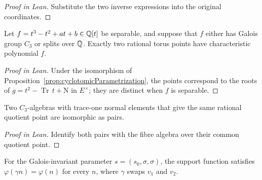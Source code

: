 \begin{proof}[Proof in Lean]

\leanok

Substitute the two inverse expressions into the original coordinates.

\end{proof}

\begin{supportinglemma}

\label{helper:polynomialFibres}


\leanok

Let $f=t^3-t^2+at+b\in\mathbb{Q}[t]$ be separable, and suppose that $f$ either has Galois group $C_3$ or splits over $\mathbb{Q}$. Exactly two rational torus points have characteristic polynomial $f$.

\end{supportinglemma}

\begin{proof}[Proof in Lean]

\leanok

Under the isomorphism of Proposition~\ref{prop:cyclotomicParametrization}, the points correspond to the roots of $g=t^2-\operatorname{Tr}\,t+\mathrm N$ in $E^\times$; they are distinct when $f$ is separable.

\end{proof}

\begin{supportinglemma}

\label{helper:moduliFibres}


\leanok

Two $C_3$-algebras with trace-one normal elements that give the same rational quotient point are isomorphic as pairs.

\end{supportinglemma}

\begin{proof}[Proof in Lean]

\leanok

Identify both pairs with the fibre algebra over their common quotient point.

\end{proof}

\begin{supportinglemma}

\label{helper:supportFunctionSymmetry}


\leanok

For the Galois-invariant parameter $s=(s_0,\sigma,\sigma)$, the support function satisfies $\varphi(\gamma n)=\varphi(n)$ for every $n$, where $\gamma$ swaps $v_1$ and $v_2$.

\end{supportinglemma}

